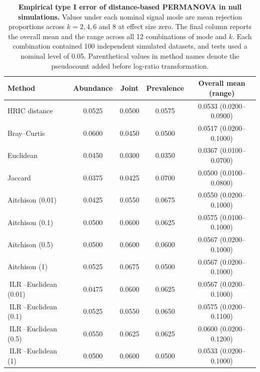 \begin{table}[t]
    \centering
    \caption{\textbf{Empirical type I error of distance-based PERMANOVA in null simulations.}
    Values under each nominal signal mode are mean rejection proportions across
    \(k=2,4,6\) and 8 at effect size zero. The final column reports the
    overall mean and the range across all 12 combinations of mode and \(k\).
    Each combination contained 100 independent simulated datasets, and tests
    used a nominal level of 0.05. Parenthetical values in method names
    denote the pseudocount added before log-ratio transformation.}
    \label{tab:simulation-type1}
    \begin{tabular}{lcccc}
        \toprule
        Method & Abundance & Joint & Prevalence & Overall mean (range) \\
        \midrule
        HRIC distance & 0.0525 & 0.0500 & 0.0575 & 0.0533 (0.0200--0.0900) \\
        Bray--Curtis & 0.0600 & 0.0450 & 0.0500 & 0.0517 (0.0200--0.1000) \\
        Euclidean & 0.0450 & 0.0300 & 0.0350 & 0.0367 (0.0100--0.0700) \\
        Jaccard & 0.0375 & 0.0425 & 0.0700 & 0.0500 (0.0100--0.0800) \\
        Aitchison (0.01) & 0.0425 & 0.0550 & 0.0675 & 0.0550 (0.0200--0.1000) \\
        Aitchison (0.1) & 0.0500 & 0.0600 & 0.0625 & 0.0575 (0.0100--0.1000) \\
        Aitchison (0.5) & 0.0500 & 0.0600 & 0.0600 & 0.0567 (0.0200--0.1000) \\
        Aitchison (1) & 0.0525 & 0.0675 & 0.0500 & 0.0567 (0.0200--0.1000) \\
        \(\operatorname{ILR}\)--Euclidean (0.01) & 0.0475 & 0.0600 & 0.0625 & 0.0567 (0.0200--0.1000) \\
        \(\operatorname{ILR}\)--Euclidean (0.1) & 0.0525 & 0.0550 & 0.0650 & 0.0575 (0.0200--0.1100) \\
        \(\operatorname{ILR}\)--Euclidean (0.5) & 0.0550 & 0.0625 & 0.0625 & 0.0600 (0.0200--0.1200) \\
        \(\operatorname{ILR}\)--Euclidean (1) & 0.0500 & 0.0600 & 0.0500 & 0.0533 (0.0200--0.1000) \\
        \bottomrule
    \end{tabular}
\end{table}
